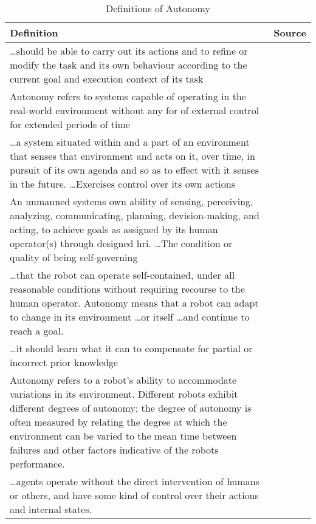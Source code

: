 \begin{table}\centering
  \caption{Definitions of Autonomy}
  \label{tab:autonomy_definitions}
  \begin{tabularx}{\textwidth}{X p{3cm}}\toprule
    Definition & Source \\ \midrule
    \ldots should be able to carry out its actions and to refine or modify the task and its own behaviour according to the current goal and execution context of its task & \citet{Alami1998}\\
    Autonomy refers to systems capable of operating in the real-world environment without any for of external control for extended periods of time & \citet{Bekey2005}\\
    \ldots a system situated within and a part of an environment that senses that environment and acts on it, over time, in pursuit of its own agenda and so as to effect with it senses in the future. \ldots Exercises control over its own actions & \citet{Franklin1997} \\
    An unmanned systems own ability of sensing, perceiving, analyzing, communicating, planning, devision-making, and acting, to achieve goals as assigned by its human operator(s) through designed \gls{hri}. \ldots The condition or quality of being self-governing & \citet{Huang2004}\\
    \ldots that the robot can operate self-contained, under all reasonable conditions without requiring recourse to the human operator. Autonomy means that a robot can adapt to change in its environment \ldots or itself \ldots and continue to reach a goal. & \citet{Murphy2000}\\
    \ldots it should learn what it can to compensate for partial or incorrect prior knowledge & \citet{Russell2009} \\
    Autonomy refers to a robot's ability to accommodate variations in its environment. Different robots exhibit different degrees of autonomy; the degree of autonomy is often measured by relating the degree at which the environment can be varied to the mean time between failures and other factors indicative of the robots performance. & \citet{Thrun2004}\\
    \ldots agents operate without the direct intervention of humans or others, and have some kind of control over their actions and internal states. & \citet{Wooldridge1995}\\\bottomrule
  \end{tabularx}
\end{table}

